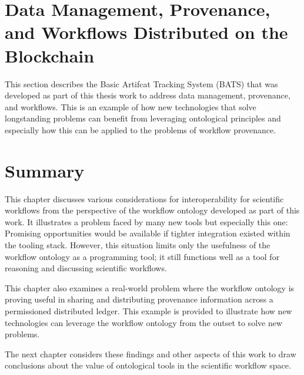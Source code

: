 \section{Data Management, Provenance, and Workflows Distributed on the
Blockchain}


This section describes the Basic Artifcat Tracking System (BATS) that
was developed as part of this thesis work to address data management,
provenance, and workflows. This is an example of how new technologies that solve
longstanding problems can benefit from leveraging ontological principles and
especially how this can be applied to the problems of workflow provenance.


\section{Summary}

This chapter discusses various considerations for interoperability for
scientific workflows from the perspective of the workflow ontology developed as
part of this work. It illustrates a problem faced by many new tools but
especially this one: Promising opportunities would be available if tighter
integration existed within the tooling stack. However, this situation limits
only the usefulness of the workflow ontology as a programming tool; it still
functions well as a tool for reasoning and discussing scientific workflows. 

This chapter also examines a real-world problem where the workflow ontology is
proving useful in sharing and distributing provenance information across a
permissioned distributed ledger. This example is provided to illustrate how new
technologies can leverage the workflow ontology from the outset to solve new
problems. 

The next chapter considers these findings and other aspects of this work to
draw conclusions about the value of ontological tools in the scientific workflow
space.